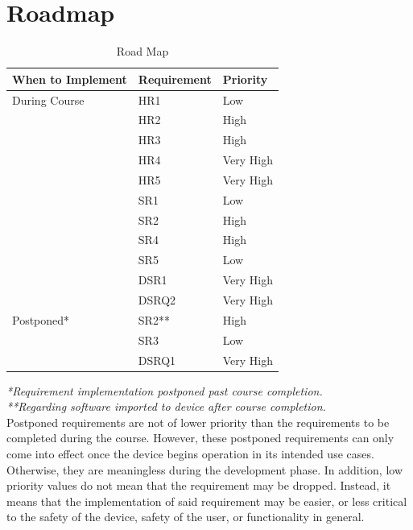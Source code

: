 \documentclass{article}
\begin{document}
\section{Roadmap}
\begin{table}[H]
	\caption{Road Map} \label{RoadMap}
	\begin{tabularx}{\textwidth}{llX}
		\toprule
		\textbf{When to Implement} & \textbf{Requirement} & \textbf{Priority}        \\
		\midrule
		During Course         	& HR1               	& Low					\\
		         			& HR2              		& High 					\\
		          			& HR3                   	& High                   	     		\\
						& HR4 			& Very High 			 \\	
		          			& HR5                   	& Very High                   	     \\
		          			& SR1                   	& Low                   	     \\
		          			& SR2     			& High                   	     \\
		          			& SR4                   	& High                   	     \\
		          			& SR5                   	& Low                   	     \\
		          			& DSR1                   	& Very High                   	     \\
		          			& DSRQ2                   & Very High                   	     \\
		Postponed*		& SR2** 			& High                               \\
						& SR3 			& Low                               \\
						& DSRQ1 			& Very High                               \\
		\bottomrule
	\end{tabularx}
\end{table}

\textit{*Requirement implementation postponed past course completion.}\\
\textit{**Regarding software imported to device after course completion.}\\

Postponed requirements are not of lower priority than the requirements to be completed during the course. However, these postponed requirements can only come into effect once the device begins operation in its intended use cases. Otherwise, they are meaningless during the development phase. In addition, low priority values do not mean that the requirement may be dropped. Instead, it means that the implementation of said requirement may be easier, or less critical to the safety of the device, safety of the user, or functionality in general.\\
\end{document}
